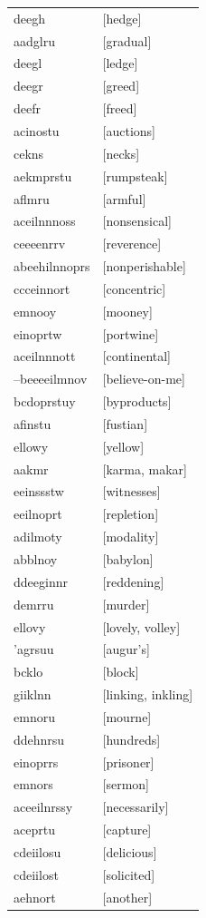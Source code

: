 \documentclass{article}
\begin{document}
\begin{tabular}{ll}
deegh & [hedge] \\
aadglru & [gradual] \\
deegl & [ledge] \\
deegr & [greed] \\
deefr & [freed] \\
acinostu & [auctions] \\
cekns & [necks] \\
aekmprstu & [rumpsteak] \\
aflmru & [armful] \\
aceilnnnoss & [nonsensical] \\
ceeeenrrv & [reverence] \\
abeehilnnoprs & [nonperishable] \\
ccceinnort & [concentric] \\
emnooy & [mooney] \\
einoprtw & [portwine] \\
aceilnnnott & [continental] \\
--beeeeilmnov & [believe-on-me] \\
bcdoprstuy & [byproducts] \\
afinstu & [fustian] \\
ellowy & [yellow] \\
aakmr & [karma, makar] \\
eeinssstw & [witnesses] \\
eeilnoprt & [repletion] \\
adilmoty & [modality] \\
abblnoy & [babylon] \\
ddeeginnr & [reddening] \\
demrru & [murder] \\
ellovy & [lovely, volley] \\
'agrsuu & [augur's] \\
bcklo & [block] \\
giiklnn & [linking, inkling] \\
emnoru & [mourne] \\
ddehnrsu & [hundreds] \\
einoprrs & [prisoner] \\
emnors & [sermon] \\
aceeilnrssy & [necessarily] \\
aceprtu & [capture] \\
cdeiilosu & [delicious] \\
cdeiilost & [solicited] \\
aehnort & [another] \\

\end{tabular}
\end{document}
